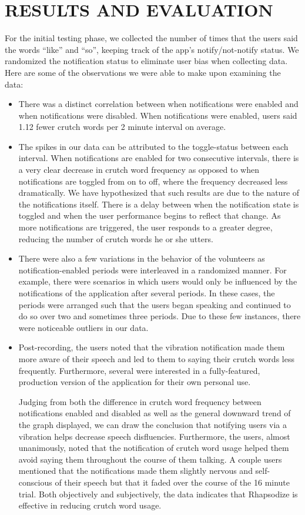\documentclass{sigchi}
\begin{document}
\section{RESULTS AND EVALUATION}


For the initial testing phase, we collected the number of times that the users said the words “like” and “so”, keeping track of the app’s notify/not-notify status. We randomized the notification status to  eliminate user bias when collecting data. Here are some of the observations we were able to make upon examining the data:

\begin{itemize}
\item There was a distinct correlation between when notifications were enabled and when notifications were disabled. When notifications were enabled, users said 1.12 fewer crutch words per 2 minute interval on average.
\item The spikes in our data can be attributed to the toggle-status between each interval. When notifications are enabled for two consecutive intervals, there is a very clear decrease in crutch word frequency as opposed to when notifications are toggled from on to off, where the frequency decreased less dramatically. We have hypothesized that such results are due to the nature of the notifications itself. There is a delay between when the notification state is toggled and when the user performance begins to reflect that change. As more notifications are triggered, the user responds to a greater degree, reducing the number of crutch words he or she utters.
\item There were also a few variations in the behavior of the volunteers as notification-enabled periods were interleaved in a randomized manner. For example, there were scenarios in which users would only be influenced by the notifications of the application after several periods. In these cases, the periods were arranged such that the users began speaking and continued to do so over two and sometimes three periods. Due to these few instances, there were noticeable outliers in our data.
\item Post-recording, the users noted that the vibration notification made them more aware of their speech and led to them to saying their crutch words less frequently. Furthermore, several were interested in a fully-featured, production version of the application for their own personal use.

Judging from both the difference in crutch word frequency between notifications enabled and disabled as well as the general downward trend of the graph displayed, we can draw the conclusion that notifying users via  a vibration helps decrease speech disfluencies. Furthermore, the users, almost unanimously, noted that the notification of crutch word usage helped them avoid saying them throughout the course of them talking. A couple users mentioned that the notifications made them slightly nervous and self-conscious of their speech but that it faded over the course of the 16 minute trial. Both objectively and subjectively, the data indicates that Rhapsodize is effective in reducing crutch word usage.
\end{itemize}
\end{document}
